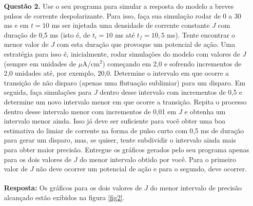 \documentclass[english,11pt,a4paper]{article}
\begin{document}
	\noindent \textbf{Questão 2.} Use o seu programa para simular a resposta do modelo a breves pulsos de corrente despolarizante. Para isso, faça sua simulação rodar de 0 a 30 ms e em $t = 10$ ms ser injetada uma densidade de corrente constante $J$ com duração de 0,5 ms (isto é, de $t_i = 10$ ms até $t_f = 10{,}5$ ms). Tente encontrar o menor valor de $J$ com esta duração que provoque um potencial de ação. Uma estratégia para isso é, inicialmente, rodar simulações do modelo com valores de $J$ (sempre em unidades de $\mu$A/cm$^2$) começando em 2,0 e sofrendo incrementos de 2,0 unidades até, por exemplo, 20,0. Determine o intervalo em que ocorre a transição de não disparo (apenas uma flutuação sublimiar) para um disparo. Em seguida, faça simulações para $J$ dentro desse intervalo com incrementos de 0,5 e determine um novo intervalo menor em que ocorre a transição. Repita o processo dentro desse intervalo menor com incrementos de 0,01 em $J$ e obtenha um intervalo menor ainda. Isso já deve ser suficiente para você obter uma boa estimativa do limiar de corrente na forma de pulso curto com 0,5 ms de duração para gerar um disparo, mas, se quiser, tente subdividir o intervalo ainda mais para obter maior precisão. Entregue os gráficos gerados pelo seu programa apenas para os dois valores de $J$ do menor intervalo obtido por você. Para o primeiro valor de $J$ não deve ocorrer um potencial de ação e para o segundo, deve ocorrer.\\\\
	
	\noindent\textbf{Resposta:} Os gráficos para os dois valores de $J$ do menor intervalo de precisão alcançado estão exibidos na figura \ref{fig2}.
	
\end{document}
